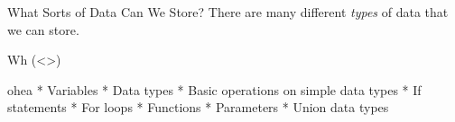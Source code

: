 \documentclass{acm}
\begin{document}
\begin{frame}{What Sorts of Data Can We Store?}
    There are many different \textit{types} of data that we can store.
\end{frame}

\begin{frame}{Wh}
    (<>)
\end{frame}

\begin{frame}{ohea}
    * Variables
        * Data types
    * Basic operations on simple data types
    * If statements
    * For loops
    * Functions
        * Parameters
    * Union data types
\end{frame}
\end{document}
